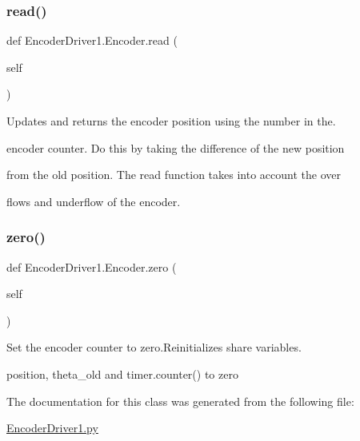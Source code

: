 \subsubsection{\texorpdfstring{read()}{read()}}
{\footnotesize\ttfamily def Encoder\+Driver1.\+Encoder.\+read (\begin{DoxyParamCaption}\item[{}]{self }\end{DoxyParamCaption})}



Updates and returns the encoder position using the number in the. 

encoder counter. Do this by taking the difference of the new position

from the old position. The read function takes into account the over

flows and underflow of the encoder. \mbox{\label{classEncoderDriver1_1_1Encoder_a9d715e18b6509019f5233b8f31af2c0c}} 
\subsubsection{\texorpdfstring{zero()}{zero()}}
{\footnotesize\ttfamily def Encoder\+Driver1.\+Encoder.\+zero (\begin{DoxyParamCaption}\item[{}]{self }\end{DoxyParamCaption})}



Set the encoder counter to zero.\+Reinitializes share variables. 

position, theta\+\_\+old and timer.\+counter() to zero 

The documentation for this class was generated from the following file\+:\begin{DoxyCompactItemize}
\item 
\mbox{\hyperlink{EncoderDriver1_8py}{Encoder\+Driver1.\+py}}\end{DoxyCompactItemize}
